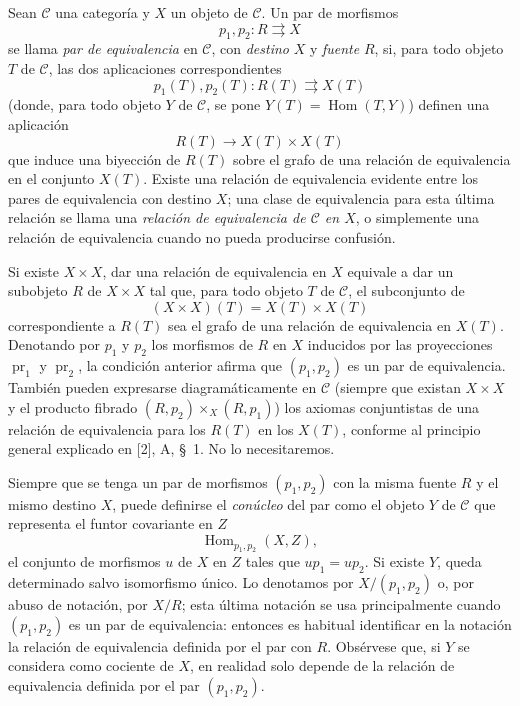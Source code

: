 \documentclass[11pt,twoside,openany]{book}
\numberwithin{equation}{section}
\newcommand{\src}[1]{%
  \phantomsection\hypertarget{src:#1}{}%
  \marginpar{\raggedleft\footnotesize\sffamily #1}%
}
\theoremstyle{plain}
\theoremstyle{definition}
\theoremstyle{remark}
\newcommand{\FgaUnitKey}{frontmatter}
\renewcommand{\src}[1]{%
  \phantomsection\hypertarget{src:\FgaUnitKey:#1}{}%
  \marginpar{\raggedleft\footnotesize\sffamily #1}%
}
\theoremstyle{plain}
\theoremstyle{definition}
\theoremstyle{remark}
\begin{document}
Sean $\mathcal C$ una categoría y $X$ un objeto de $\mathcal C$. Un par de
morfismos
\[
  p_1,p_2:R\rightrightarrows X
\]
se llama \emph{par de equivalencia} en $\mathcal C$, con \emph{destino} $X$
y \emph{fuente} $R$, si, para todo objeto $T$ de $\mathcal C$, las dos
aplicaciones correspondientes
\[
  p_1(T),p_2(T):R(T)\rightrightarrows X(T)
\]
(donde, para todo objeto $Y$ de $\mathcal C$, se pone
$Y(T)=\operatorname{Hom}(T,Y)$) definen una aplicación
\[
  R(T)\longrightarrow X(T)\times X(T)
\]
que induce una biyección de $R(T)$ sobre el grafo de una relación de
equivalencia en el conjunto $X(T)$. Existe una relación de equivalencia
evidente entre los pares de equivalencia con destino $X$; una clase de
equivalencia para esta última relación se llama una \emph{relación de
equivalencia de $\mathcal C$ en $X$}, o simplemente una relación de
equivalencia cuando no pueda producirse confusión.

Si existe $X\times X$, dar una relación de equivalencia en $X$ equivale a dar
un subobjeto $R$ de $X\times X$ tal que, para todo objeto $T$ de $\mathcal C$,
el subconjunto de
\[
  (X\times X)(T)=X(T)\times X(T)
\]
correspondiente a $R(T)$ sea el grafo de una relación de equivalencia en
$X(T)$. Denotando por $p_1$ y $p_2$ los morfismos de $R$ en $X$ inducidos por
las proyecciones $\operatorname{pr}_1$ y $\operatorname{pr}_2$, la condición
anterior afirma que $(p_1,p_2)$ es un par de equivalencia. También pueden
expresarse diagramáticamente en $\mathcal C$ (siempre que existan $X\times X$
y el producto fibrado $(R,p_2)\times_X(R,p_1)$) los axiomas conjuntistas de
una relación de equivalencia para los $R(T)$ en los $X(T)$, conforme al
principio general explicado en [2], A, \S~1. No lo necesitaremos.

Siempre que se tenga un par de morfismos $(p_1,p_2)$ con la misma fuente $R$
y el mismo destino $X$, puede definirse el \emph{conúcleo} del par como el
objeto $Y$ de $\mathcal C$ que representa el funtor covariante en $Z$
\[
  \operatorname{Hom}_{p_1,p_2}(X,Z),
\]
el conjunto de morfismos $u$ de $X$ en $Z$ tales que $up_1=up_2$. Si existe
$Y$, queda determinado salvo isomorfismo único. Lo denotamos por
$X/(p_1,p_2)$ o, por abuso de notación, por $X/R$; esta última notación se usa
principalmente cuando
\src{101}$(p_1,p_2)$ es un par de equivalencia: entonces es habitual
identificar en la notación la relación de equivalencia definida por el par con
$R$. Obsérvese que, si $Y$ se considera como cociente de $X$, en realidad solo
depende de la relación de equivalencia definida por el par $(p_1,p_2)$.
\end{document}
